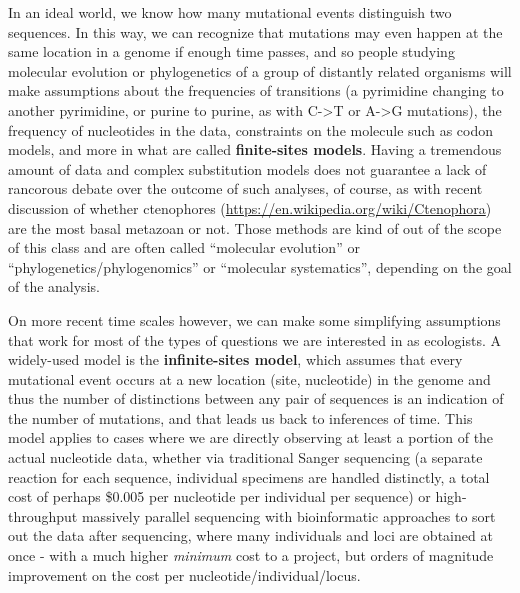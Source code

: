 \documentclass[
]{article}
\begin{document}
In an ideal world, we know how many mutational events distinguish two
sequences. In this way, we can recognize that mutations may even happen
at the same location in a genome if enough time passes, and so people
studying molecular evolution or phylogenetics of a group of distantly
related organisms will make assumptions about the frequencies of
transitions (a pyrimidine changing to another pyrimidine, or purine to
purine, as with C-\textgreater T or A-\textgreater G mutations), the
frequency of nucleotides in the data, constraints on the molecule such
as codon models, and more in what are called \textbf{finite-sites
models}. Having a tremendous amount of data and complex substitution
models does not guarantee a lack of rancorous debate over the outcome of
such analyses, of course, as with recent discussion of whether
ctenophores (\url{https://en.wikipedia.org/wiki/Ctenophora}) are the
most basal metazoan or not. Those methods are kind of out of the scope
of this class and are often called ``molecular evolution'' or
``phylogenetics/phylogenomics'' or ``molecular systematics'', depending
on the goal of the analysis.

On more recent time scales however, we can make some simplifying
assumptions that work for most of the types of questions we are
interested in as ecologists. A widely-used model is the
\textbf{infinite-sites model}, which assumes that every mutational event
occurs at a new location (site, nucleotide) in the genome and thus the
number of distinctions between any pair of sequences is an indication of
the number of mutations, and that leads us back to inferences of time.
This model applies to cases where we are directly observing at least a
portion of the actual nucleotide data, whether via traditional Sanger
sequencing (a separate reaction for each sequence, individual specimens
are handled distinctly, a total cost of perhaps \$0.005 per nucleotide
per individual per sequence) or high-throughput massively parallel
sequencing with bioinformatic approaches to sort out the data after
sequencing, where many individuals and loci are obtained at once - with
a much higher \emph{minimum} cost to a project, but orders of magnitude
improvement on the cost per nucleotide/individual/locus.
\end{document}
